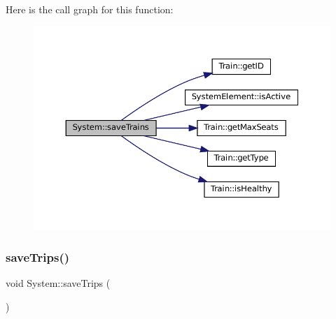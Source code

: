 Here is the call graph for this function\+:
\nopagebreak
\begin{figure}[H]
\begin{center}
\leavevmode
\includegraphics[width=350pt]{classSystem_a83c5a9ae95096cbd03ba559b042ee5e1_cgraph}
\end{center}
\end{figure}
\mbox{\label{classSystem_ab0f54bdbc0d263d96d17e6fd38328c1e}} 
\subsubsection{\texorpdfstring{save\+Trips()}{saveTrips()}}
{\footnotesize\ttfamily void System\+::save\+Trips (\begin{DoxyParamCaption}{ }\end{DoxyParamCaption})}

